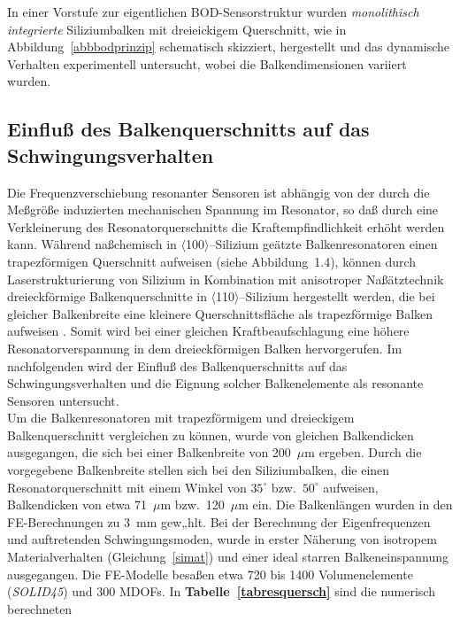 In einer Vorstufe zur eigentlichen BOD-Sensorstruktur wurden
{\em monolithisch integrierte} Siliziumbalken mit dreieickigem Querschnitt,
wie in Abbildung~\ref{abbbodprinzip} schematisch skizziert, hergestellt und
das dynamische Verhalten experimentell untersucht, wobei die
Balkendimensionen variiert wurden.



\subsection{Einfluß des Balkenquerschnitts auf das Schwingungsverhalten}
\label{balkenquerschnitt}
  
Die Frequenzverschiebung resonanter Sensoren ist abhängig von der durch die
Meßgröße induzierten mechanischen Spannung im Resonator, so daß durch eine
Verkleinerung des
Resonatorquerschnitts die Kraftempfindlichkeit erhöht werden kann.
Während naßchemisch in $\langle$100$\rangle$--Silizium geätzte
Balkenresonatoren einen
trapez\-förmigen Querschnitt aufweisen (siehe Abbildung~1.4), können durch
Laserstrukturierung von Silizium in Kombination mit anisotroper Naßätztechnik
dreieckförmige Balkenquerschnitte in $\langle$110$\rangle$--Silizium
hergestellt werden, die bei gleicher Balkenbreite eine
kleinere Querschnittsfläche als
trapez\-förmige Balken aufweisen \cite{Ala92b}.
Somit wird bei einer gleichen Kraftbeaufschlagung eine höhere
Resonatorverspannung in dem dreieckförmigen Balken hervorgerufen.
Im nachfolgenden wird der Einfluß des Balkenquerschnitts auf das
Schwingungsverhalten und die Eignung solcher Balkenelemente als resonante
Sensoren untersucht.\\
%
Um die Balkenresonatoren mit trapezförmigem und dreieckigem Balkenquerschnitt
vergleichen zu können, wurde von gleichen Balkendicken ausgegangen, die
sich bei einer Balkenbreite von 200~$\mu$m ergeben. Durch die vorgegebene
Balkenbreite stellen sich bei den Siliziumbalken, die einen
Resonatorquerschnitt mit einem Winkel von $35^{\circ}$ bzw.\ $50^{\circ}$
aufweisen, Balkendicken
von etwa 71~$\mu$m bzw.\ 120~$\mu$m ein. Die Balkenlängen wurden in den
FE-Berechnungen zu 3~mm gew„hlt. Bei der Berechnung der Eigenfrequenzen
und auftretenden Schwingungsmoden, wurde in erster Näherung von isotropem
Materialverhalten (Gleichung~\ref{simat}) und einer ideal starren
Balkeneinspannung ausgegangen. Die FE-Modelle besaßen etwa 720 bis 1400
Volumenelemente ({\em SOLID45}) und 300 MDOFs.
In {\bf Tabelle~\ref{tabresquersch}} sind die numerisch berechneten
